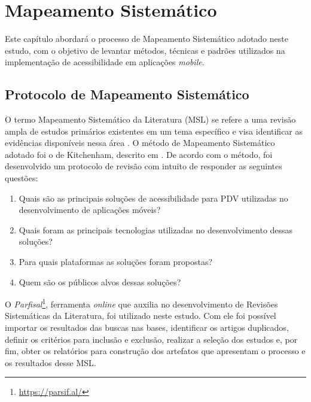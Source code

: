 \chapter{Mapeamento Sistemático}
Este capítulo abordará o processo de Mapeamento Sistemático adotado neste estudo, com o objetivo de levantar métodos, técnicas e padrões utilizados na implementação de acessibilidade em aplicações \emph{mobile}.


\section{Protocolo de Mapeamento Sistemático}
O termo Mapeamento Sistemático da Literatura (MSL) se refere a uma revisão ampla de estudos primários existentes em um tema específico e visa identificar as evidências disponíveis nessa área \cite{Kitchenham2007}.
O método de Mapeamento Sistemático adotado foi o de Kitchenham, descrito em .
De acordo com o método, foi desenvolvido um protocolo de revisão com intuito de responder as seguintes questões:
\begin{enumerate}
\item Quais são as principais soluções de acessibilidade para PDV utilizadas no desenvolvimento de aplicações móveis?
\item Quais foram as principais tecnologias utilizadas no desenvolvimento dessas soluções?
\item Para quais plataformas as soluções foram propostas?
\item Quem são os públicos alvos dessas soluções?
\end{enumerate}

O \emph{Parfisal}\footnote{\url{https://parsif.al/}}, ferramenta \emph{online} que auxilia no desenvolvimento de Revisões Sistemáticas da Literatura, foi utilizado neste estudo.
Com ele foi possível importar os resultados das buscas nas bases, identificar os artigos duplicados, definir os critérios para inclusão e exclusão, realizar a seleção dos estudos e, por fim, obter os relatórios para construção dos artefatos que apresentam o processo e os resultados desse MSL.

